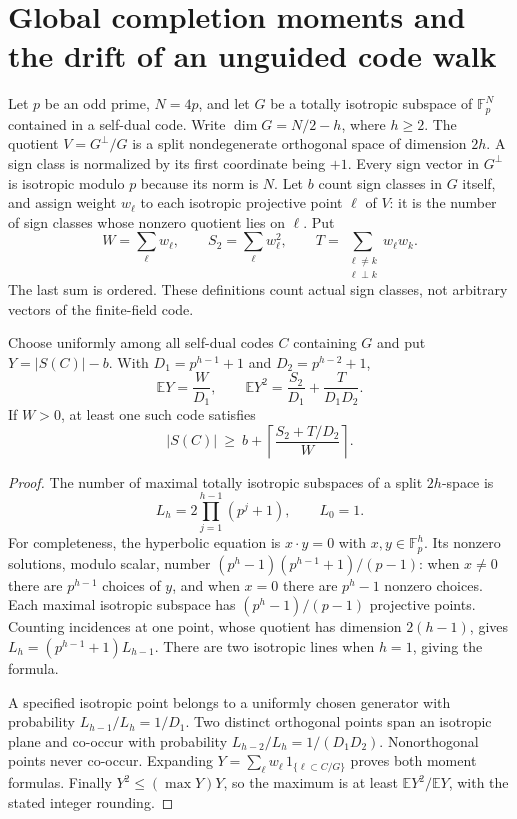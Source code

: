 \section{Global completion moments and the drift of an unguided code walk}
\label{sec:completion-moments}

Let $p$ be an odd prime, $N=4p$, and let $G$ be a totally isotropic
subspace of $\mathbb F_p^N$ contained in a self-dual code. Write
$\dim G=N/2-h$, where $h\ge2$. The quotient
$V=G^\perp/G$ is a split nondegenerate orthogonal space of dimension
$2h$. A sign class is normalized by its first coordinate being $+1$.
Every sign vector in $G^\perp$ is isotropic modulo $p$ because its
norm is $N$. Let $b$ count sign classes in $G$ itself, and assign
weight $w_\ell$ to each isotropic projective point $\ell$ of $V$:
it is the number of sign classes whose nonzero quotient lies on
$\ell$. Put
\[
 W=\sum_\ell w_\ell,\qquad S_2=\sum_\ell w_\ell^2,\qquad
 T=\sum_{\substack{\ell\ne k\\\ell\perp k}}w_\ell w_k.
\]
The last sum is ordered. These definitions count actual sign classes,
not arbitrary vectors of the finite-field code.

\begin{theorem}
\label{mom:two}
Choose uniformly among all self-dual codes $C$ containing $G$ and
put $Y=|S(C)|-b$. With $D_1=p^{h-1}+1$ and $D_2=p^{h-2}+1$,
\[
 \mathbb E Y=\frac{W}{D_1},\qquad
 \mathbb E Y^2=\frac{S_2}{D_1}+\frac{T}{D_1D_2}.
\]
If $W>0$, at least one such code satisfies
\[
 |S(C)|\ \ge\
 b+\left\lceil\frac{S_2+T/D_2}{W}\right\rceil.
\]
\end{theorem}
\begin{proof}
The number of maximal totally isotropic subspaces of a split
$2h$-space is
\[
 L_h=2\prod_{j=1}^{h-1}(p^j+1),\qquad L_0=1.
\]
For completeness, the hyperbolic equation is $x\cdot y=0$ with
$x,y\in\mathbb F_p^h$. Its nonzero solutions, modulo scalar, number
$(p^h-1)(p^{h-1}+1)/(p-1)$: when $x\ne0$ there are $p^{h-1}$
choices of $y$, and when $x=0$ there are $p^h-1$ nonzero choices.
Each maximal isotropic subspace has $(p^h-1)/(p-1)$ projective points.
Counting incidences at one point, whose quotient has dimension
$2(h-1)$, gives $L_h=(p^{h-1}+1)L_{h-1}$.
There are two isotropic lines when $h=1$, giving the formula.

A specified isotropic point belongs to a uniformly chosen generator
with probability $L_{h-1}/L_h=1/D_1$. Two distinct orthogonal points
span an isotropic plane and co-occur with probability
$L_{h-2}/L_h=1/(D_1D_2)$. Nonorthogonal points never co-occur.
Expanding $Y=\sum_\ell w_\ell\,1_{\{\ell\subset C/G\}}$ proves both
moment formulas. Finally $Y^2\le(\max Y)Y$, so the maximum is at least
$\mathbb E Y^2/\mathbb E Y$, with the stated integer rounding.
\end{proof}

